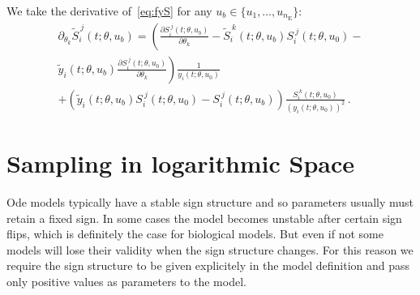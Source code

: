 \documentclass[utf8,english]{scrartcl}
\begin{document}
We take the derivative of~\eqref{eq:fyS} for any $u_b\in\{u_1,\dots,u_{n_{\text{E}}}\}$:
\begin{multline}
  \partial_{\theta_k} \tilde S_i^{~j}(t;\theta,u_b)
  =\left(\frac{\partial S_i^{~j}(t;\theta,u_b)}{\partial\theta_k} -\right.
    \tilde S_i^{~k}(t;\theta,u_b)S_i^{~j}(t;\theta,u_0) -\\ 
    \left.\tilde y_i(t;\theta,u_b)\frac{\partial S_i^{~j}(t;\theta,u_0)}{\partial
      \theta_k}\right) \frac{1}{y_i(t;\theta,u_0)}\\
  +\left(\tilde y_i(t;\theta,u_b) S_i^{~j}(t;\theta,u_0) - S_i^{~j}(t;\theta,u_b)\right)\frac{S_i^{~k}(t;\theta,u_0)}{(y_i(t;\theta,u_0))^2}\label{eq:dfyS}\,.
\end{multline}

\section{Sampling in logarithmic Space}
\label{sec:rho}

Ode models typically have a stable sign structure and so parameters
usually must retain a fixed sign. In some cases the model becomes
unstable after certain sign flips, which is definitely the case for
biological models. But even if not some models will lose their
validity when the sign structure changes. For this reason we require
the sign structure to be given explicitely in the model definition and
pass only positive values as parameters to the model.
\end{document}
